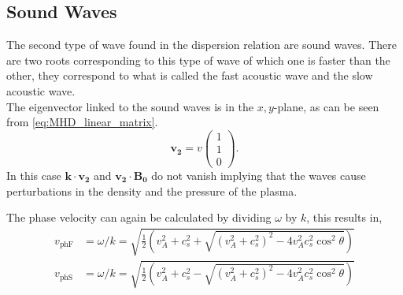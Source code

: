 \documentclass{article}
\begin{document}
\subsection{Sound Waves}
The second type of wave found in the dispersion relation are sound waves. There are two roots corresponding to this type of wave of which one is faster than the other, they correspond to what is called the fast acoustic wave and the slow acoustic wave.\\

The eigenvector linked to the sound waves is in the $x,y$-plane, as can be seen from \cref{eq:MHD_linear_matrix}.
\[
	\mathbf{v_2} = v \begin{pmatrix} 1 \\ 1 \\ 0 \end{pmatrix} 
.\] 
In this case $\mathbf{k\cdot v_2}$ and $\mathbf{v_2 \cdot B_0}$ do not vanish implying that the waves cause perturbations in the density and the pressure of the plasma.

The phase velocity can again be calculated by dividing $\omega$ by $k$, this results in,
\begin{align*}
    v_{\text{phF}} &= \omega/k = \sqrt{\frac{1}{2}\left(v_A^2 + c_s^2 + \sqrt{(v_A^2 + c_s^2)^2 - 4v_A^2c_s^2\cos^2\theta}\right)}\\
    v_{\text{phS}} &= \omega/k = \sqrt{\frac{1}{2}\left(v_A^2 + c_s^2 - \sqrt{(v_A^2 + c_s^2)^2 - 4v_A^2c_s^2\cos^2\theta}\right)}
\end{align*}\\
\end{document}
